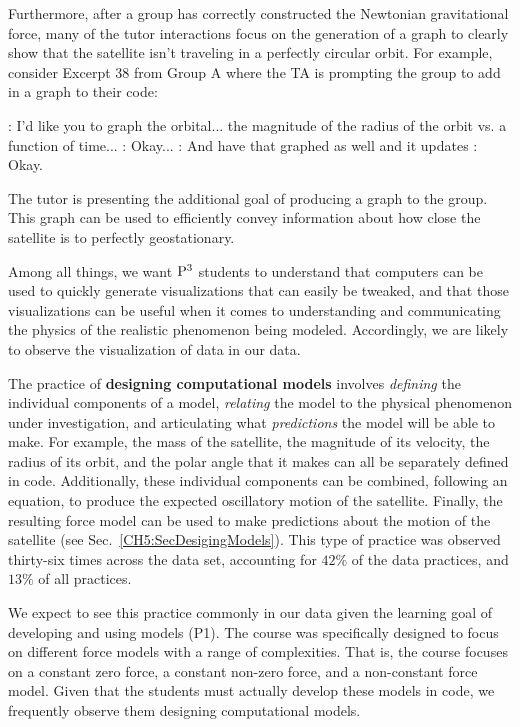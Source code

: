 \documentclass{msuphddissertation}
\begin{document}
\begin{doublespace}
Furthermore, after a group has correctly constructed the Newtonian gravitational force, many of the tutor interactions focus on the generation of a graph to clearly show that the satellite isn't traveling in a perfectly circular orbit.  For example, consider Excerpt 38 from Group A where the TA is prompting the group to add in a graph to their code: \begin{description}
\TA: I'd like you to graph the orbital... the magnitude of the radius of the orbit vs. a function of time...
\SC: Okay...
\TA: And have that graphed as well and it updates
\SC: Okay.
\end{description}  The tutor is presenting the additional goal of producing a graph to the group.  This graph can be used to efficiently convey information about how close the satellite is to perfectly geostationary.  

Among all things, we want ${\rm P}^{3}$ students to understand that computers can be used to quickly generate visualizations that can easily be tweaked, and that those visualizations can be useful when it comes to understanding and communicating the physics of the realistic phenomenon being modeled.  Accordingly, we are likely to observe the visualization of data in our data.

The practice of \textbf{designing computational models} involves \textit{defining} the individual components of a model, \textit{relating} the model to the physical phenomenon under investigation, and articulating what \textit{predictions} the model will be able to make.  For example, the mass of the satellite, the magnitude of its velocity, the radius of its orbit, and the polar angle that it makes can all be separately defined in code.  Additionally, these individual components can be combined, following an equation, to produce the expected oscillatory motion of the satellite.  Finally, the resulting force model can be used to make predictions about the motion of the satellite (see Sec.~\ref{CH5:SecDesigingModels}).  This type of practice was observed thirty-six times across the data set, accounting for $42\%$ of the data practices, and $13\%$ of all practices.

We expect to see this practice commonly in our data given the learning goal of developing and using models (P1).  The course was specifically designed to focus on different force models with a range of complexities.  That is, the course focuses on a constant zero force, a constant non-zero force, and a non-constant force model.  Given that the students must actually develop these models in code, we frequently observe them designing computational models.


\end{doublespace}
\end{document}
